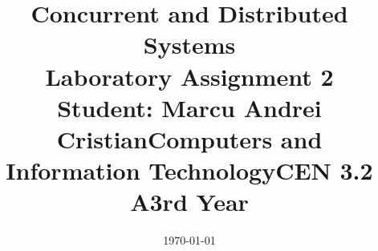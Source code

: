 \documentclass[14pt]{article}
\begin{document}
\title{%
  \huge Concurrent and Distributed Systems \\
  \vspace{20mm}
  \large Laboratory Assignment 2 \\}

\date{\today}
\maketitle
\begin{center}
\vspace{30 mm}

\title{\huge Student: Marcu Andrei Cristian}
\\\vspace{10 mm}
\title{\huge Computers and Information Technology}
\\\vspace{10 mm}
\title{\huge CEN 3.2 A}
\\\vspace{10 mm}
\title{\huge 3rd Year}
\end{center}
\date{}
\maketitle

\newpage
\end{document}
